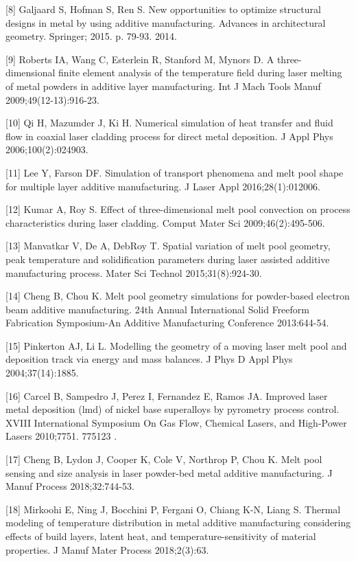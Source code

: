\documentclass[10pt]{article}
\begin{document}
[8] Galjaard S, Hofman S, Ren S. New opportunities to optimize structural designs in metal by using additive manufacturing. Advances in architectural geometry. Springer; 2015. p. 79-93. 2014.

[9] Roberts IA, Wang C, Esterlein R, Stanford M, Mynors D. A three-dimensional finite element analysis of the temperature field during laser melting of metal powders in additive layer manufacturing. Int J Mach Tools Manuf 2009;49(12-13):916-23.

[10] Qi H, Mazumder J, Ki H. Numerical simulation of heat transfer and fluid flow in coaxial laser cladding process for direct metal deposition. J Appl Phys 2006;100(2):024903.

[11] Lee Y, Farson DF. Simulation of transport phenomena and melt pool shape for multiple layer additive manufacturing. J Laser Appl 2016;28(1):012006.

[12] Kumar A, Roy S. Effect of three-dimensional melt pool convection on process characteristics during laser cladding. Comput Mater Sci 2009;46(2):495-506.

[13] Manvatkar V, De A, DebRoy T. Spatial variation of melt pool geometry, peak temperature and solidification parameters during laser assisted additive manufacturing process. Mater Sci Technol 2015;31(8):924-30.

[14] Cheng B, Chou K. Melt pool geometry simulations for powder-based electron beam additive manufacturing. 24th Annual International Solid Freeform Fabrication Symposium-An Additive Manufacturing Conference 2013:644-54.

[15] Pinkerton AJ, Li L. Modelling the geometry of a moving laser melt pool and deposition track via energy and mass balances. J Phys D Appl Phys 2004;37(14):1885.

[16] Carcel B, Sampedro J, Perez I, Fernandez E, Ramos JA. Improved laser metal deposition (lmd) of nickel base superalloys by pyrometry process control. XVIII International Symposium On Gas Flow, Chemical Lasers, and High-Power Lasers 2010;7751. 775123 .

[17] Cheng B, Lydon J, Cooper K, Cole V, Northrop P, Chou K. Melt pool sensing and size analysis in laser powder-bed metal additive manufacturing. J Manuf Process 2018;32:744-53.

[18] Mirkoohi E, Ning J, Bocchini P, Fergani O, Chiang K-N, Liang S. Thermal modeling of temperature distribution in metal additive manufacturing considering effects of build layers, latent heat, and temperature-sensitivity of material properties. J Manuf Mater Process 2018;2(3):63.
\end{document}
